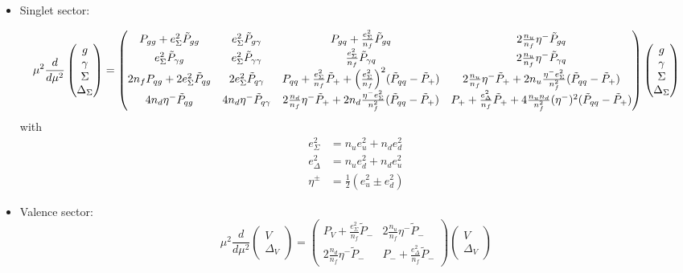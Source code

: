 \documentclass[a4paper,twoside]{article}
\title{}
\author{}
\date{}
\begin{document}
\maketitle
\begin{itemize}
\item Singlet sector:

\begin{equation*}
\mu^2\frac{d}{d\mu^2}
\begin{pmatrix}
g \\
\gamma \\
\Sigma \\
\Delta_\Sigma
\end{pmatrix}
=
\begin{pmatrix}
 P_{gg}+e_\Sigma^2 \tilde{P}_{gg} & e_\Sigma^2 \tilde{P}_{g\gamma} & P_{gq} + \frac{e_\Sigma^2}{n_f}\tilde{P}_{gq} & 2\frac{n_u}{n_f}\eta^- \tilde{P}_{gq} \\
 e_\Sigma^2 \tilde{P}_{\gamma g} & e_\Sigma^2 \tilde{P}_{\gamma \gamma} & \frac{e_\Sigma^2}{n_f}\tilde{P}_{\gamma q} & 2\frac{n_u}{n_f}\eta^- \tilde{P}_{\gamma q} \\
 2n_f P_{qg} +2e_\Sigma^2  \tilde{P}_{qg} & 2 e_\Sigma^2  \tilde{P}_{q\gamma} & P_{qq}+ \frac{e_\Sigma^2}{n_f}\tilde{P}_{+} +  \Bigl(\frac{e_\Sigma^2}{n_f}\Bigr)^2(\tilde{P}_{qq}-\tilde{P}_{+}) & 2\frac{n_u}{n_f}\eta^-\tilde{P}_{+}+2n_u \frac{\eta^-e_\Sigma^2}{n_f^2}(\tilde{P}_{qq}-\tilde{P}_{+}) \\
 4n_d\eta^-\tilde{P}_{qg} & 4n_d\eta^-\tilde{P}_{q\gamma} & 2\frac{n_d}{n_f}\eta^- \tilde{P}_{+} +2n_d \frac{\eta^-e_\Sigma^2}{n_f^2}(\tilde{P}_{qq}-\tilde{P}_{+}) & P_+ +\frac{e_\Delta^2}{n_f}\tilde{P}_{+} +4\frac{n_u n_d}{n_f^2}(\eta^-)^2(\tilde{P}_{qq}-\tilde{P}_{+})
\end{pmatrix}
\begin{pmatrix}
g \\
\gamma \\
\Sigma \\
\Delta_\Sigma
\end{pmatrix}
\end{equation*}
with
\begin{align*}
e_\Sigma^2&=n_u e_u^2+n_d e_d^2 \\
e_\Delta^2&=n_u e_d^2+n_d e_u^2 \\
\eta^\pm &= \frac{1}{2}(e_u^2 \pm e_d^2)
\end{align*}

\item Valence sector:
\begin{equation*}
\mu^2\frac{d}{d\mu^2}
\begin{pmatrix}
V \\
\Delta_V
\end{pmatrix}
=
\begin{pmatrix}
P_V+\frac{e_\Sigma^2}{n_f} \tilde{P}_{-} & 2\frac{n_u}{n_f}\eta^- \tilde{P}_{-}\\
 2\frac{n_d}{n_f}\eta^- \tilde{P}_{-}& P_-+\frac{e_\Delta^2}{n_f} \tilde{P}_{-}
\end{pmatrix}
\begin{pmatrix}
V \\
\Delta_V
\end{pmatrix}
\end{equation*}


\end{itemize}
\end{document}
